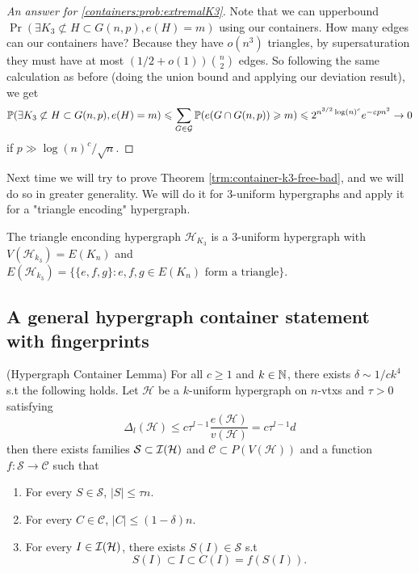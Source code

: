 \begin{proof}[An answer for \ref{containers:prob:extremalK3}]
	Note that we can upperbound $\Pr(\exists K_3 \not \subset H \subset
	G(n,p), e(H) = m)$ using our containers.
	How many edges can our containers have? Because they have $o(n^3)$
	triangles, by supersaturation they must have at most $(1/2 +
	o(1))\binom{n}{2}$ edges.
	So following the same calculation as before (doing the union bound
	and applying our deviation result), we get
	\[
		\mathbb{P}(\exists K_3 \not \subset H \subset G(n,p), e(H) = m) \leqslant
		\sum_{G \in \mathcal{G}} \mathbb{P}(e(G \cap G(n,p)) \geqslant m) \leqslant
		2^{n^{3/2}\log(n)^c}e^{-\varepsilon pn^2} \rightarrow 0
	\]
	if $p \gg \log(n)^c/\sqrt{n}$.
\end{proof}

Next time we will try to prove Theorem \ref{trm:container-k3-free-bad},
and we will do so in greater generality. We will do it for
$3$-uniform hypergraphs and apply
it for a "triangle encoding" hypergraph.
\begin{definition}
	The triangle enconding hypergraph $\mathcal{H}_{K_3}$ is a 3-uniform
	hypergraph with $V(\mathcal{H}_{k_3}) = E(K_n)$ and
	$E(\mathcal{H}_{k_3}) = \{\{e,f,g\} : e,f,g \in E(K_n) \text{ form a
	triangle}\}$.
\end{definition}

\subsection{A general hypergraph container statement with fingerprints}

\begin{lemma}
	\label{lemma:hypergraph_containers}
	(Hypergraph Container Lemma) For all $c \geq 1$ and $k \in \mathbb{N}$,
	there exists $\delta \sim 1/ck^4$ s.t the following holds.
	Let $\mathcal{H}$ be a $k$-uniform hypergraph on $n$-vtxs and $\tau
	> 0$ satisfying
	\[
		\Delta_l(\mathcal{H}) \leq
		c\tau^{l-1}\frac{e(\mathcal{H})}{v(\mathcal{H})} = c\tau^{l-1}d
	\]
	then there exists families $\mathcal{S} \subset
	\mathcal{I}(\mathcal{H})$ and $\mathcal{C}\subset P(V(\mathcal{H}))$
	and a function $f: \mathcal{S} \to \mathcal{C}$ such that
	\begin{enumerate}[label=(\alph*)]
		\item For every $S \in \mathcal{S}$, $|S| \leq \tau n$.
		\item For every $C \in \mathcal{C}$, $|C| \leq (1-\delta)n$.
		\item For every $I \in \mathcal{I}(\mathcal{H})$, there exists
			$S(I) \in \mathcal{S}$ s.t
			\[
				S(I) \subset I \subset C(I) = f(S(I)).
			\]
	\end{enumerate}
\end{lemma}

